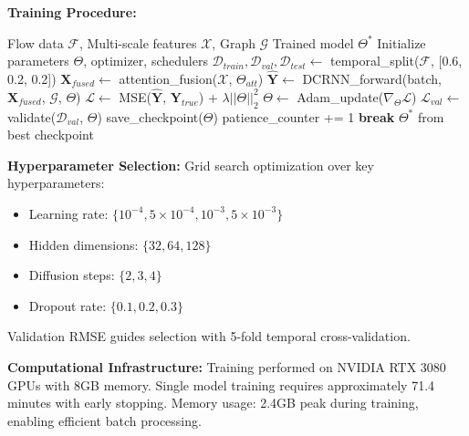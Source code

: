 \documentclass[sigconf,review,nonacm]{acmart}
\begin{document}
\textbf{Training Procedure:}
\begin{algorithm}[h]
\caption{Enhanced DCRNN Training Pipeline}
\begin{algorithmic}[1]
\Require Flow data $\mathcal{F}$, Multi-scale features $\mathcal{X}$, Graph $\mathcal{G}$
\Ensure Trained model $\Theta^*$
\State Initialize parameters $\Theta$, optimizer, schedulers
\State $\mathcal{D}_{train}, \mathcal{D}_{val}, \mathcal{D}_{test} \leftarrow$ temporal\_split($\mathcal{F}$, [0.6, 0.2, 0.2])
        \State $\mathbf{X}_{fused} \leftarrow$ attention\_fusion($\mathcal{X}$, $\Theta_{att}$)
        \State $\hat{\mathbf{Y}} \leftarrow$ DCRNN\_forward(batch, $\mathbf{X}_{fused}$, $\mathcal{G}$, $\Theta$)
        \State $\mathcal{L} \leftarrow$ MSE($\hat{\mathbf{Y}}$, $\mathbf{Y}_{true}$) + $\lambda||\Theta||_2^2$
        \State $\Theta \leftarrow$ Adam\_update($\nabla_\Theta \mathcal{L}$)
    \EndFor
    \State $\mathcal{L}_{val} \leftarrow$ validate($\mathcal{D}_{val}$, $\Theta$)
        \State save\_checkpoint($\Theta$)
    \Else
        \State patience\_counter += 1
    \EndIf
     \textbf{break} \EndIf
\EndFor
\State \Return $\Theta^*$ from best checkpoint
\end{algorithmic}
\end{algorithm}

\textbf{Hyperparameter Selection:}
Grid search optimization over key hyperparameters:
\begin{itemize}
\item Learning rate: $\{10^{-4}, 5 \times 10^{-4}, 10^{-3}, 5 \times 10^{-3}\}$
\item Hidden dimensions: $\{32, 64, 128\}$
\item Diffusion steps: $\{2, 3, 4\}$
\item Dropout rate: $\{0.1, 0.2, 0.3\}$
\end{itemize}
Validation RMSE guides selection with 5-fold temporal cross-validation.

\textbf{Computational Infrastructure:}
Training performed on NVIDIA RTX 3080 GPUs with 8GB memory. Single model training requires approximately 71.4 minutes with early stopping. Memory usage: 2.4GB peak during training, enabling efficient batch processing.
\end{document}
